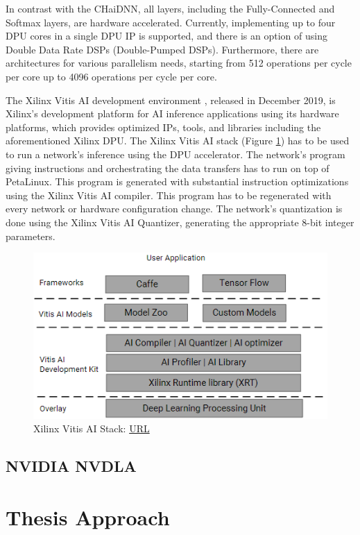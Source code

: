 In contrast with the CHaiDNN, all layers, including the Fully-Connected and Softmax layers, are hardware accelerated. Currently, implementing up to four DPU cores in a single DPU IP is supported, and there is an option of using Double Data Rate DSPs (Double-Pumped DSPs). Furthermore, there are architectures for various parallelism needs, starting from 512 operations per cycle per core up to 4096 operations per cycle per core.

The Xilinx Vitis AI development environment \cite{Xilinx-Vitis-AI}, released in December 2019, is Xilinx's development platform for AI inference applications using its hardware platforms, which provides optimized IPs, tools, and libraries including the aforementioned Xilinx DPU. The Xilinx Vitis AI stack (Figure \ref{fig:vitis-ai-stack}) has to be used to run a network's inference using the DPU accelerator. The network's program giving instructions and orchestrating the data transfers has to run on top of PetaLinux. This program is generated with substantial instruction optimizations using the Xilinx Vitis AI compiler. This program has to be regenerated with every network or hardware configuration change. The network's quantization is done using the Xilinx Vitis AI Quantizer, generating the appropriate 8-bit integer parameters.

\begin{figure} [H]
	\centering
	\includegraphics[scale=0.6]{Images/Hardware/vitis-ai-stack.png}
	\decoRule
	\caption[Xilinx Vitis AI Stack]{Xilinx Vitis AI Stack: \href{https://www.xilinx.com/support/documentation/ip_documentation/dpu/v3_2/pg338-dpu.pdf}{URL}}
	\label{fig:vitis-ai-stack}
\end{figure}

\subsection{NVIDIA NVDLA}

\section{Thesis Approach}
